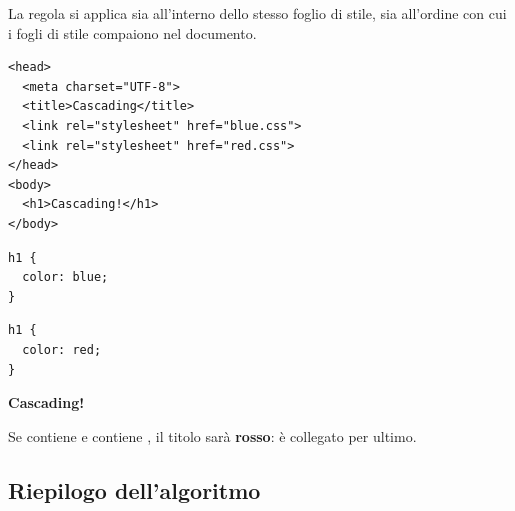 La regola si applica sia all'interno dello stesso foglio di stile, sia
all'ordine con cui i fogli di stile compaiono nel documento.

\begin{affianco}[0.55]
\begin{lstlisting}[style=html, name=ordine.html]
<head>
  <meta charset="UTF-8">
  <title>Cascading</title>
  <link rel="stylesheet" href="blue.css">
  <link rel="stylesheet" href="red.css">
</head>
<body>
  <h1>Cascading!</h1>
</body>
\end{lstlisting}
\begin{minipage}[t]{0.48\linewidth}
\begin{lstlisting}[style=css, name=blue.css]
h1 {
  color: blue;
}
\end{lstlisting}
\end{minipage}\hfill
\begin{minipage}[t]{0.48\linewidth}
\begin{lstlisting}[style=css, name=red.css]
h1 {
  color: red;
}
\end{lstlisting}
\end{minipage}
\risultato
\begin{browser}
  {\Lora\bfseries\Huge\textcolor{css-red}{Cascading!}}
\end{browser}
\end{affianco}

Se  contiene  e 
contiene , il titolo sarà \textbf{rosso}: 
è collegato per ultimo.

\subsection{Riepilogo dell'algoritmo}

